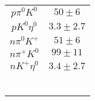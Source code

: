 \begin{table}[h]
{\begin{tabular}{|c|c|}
			$ p \pi^{0} K^{0} $ & $    50 \pm     6 $ \\
		$ p K^{0} \eta^{0} $ & $     3.3 \pm     2.7 $ \\
		$n \pi^{0} K^{+} $ & $    51 \pm     6 $ \\
		$ n \pi^{+} K^{0} $ & $    99 \pm    11 $ \\
		$n K^{+} \eta^{0} $ & $     3.4 \pm     2.7 $ \\
		&   \\
		&   \\
		&   \\
		&   \\
		&   \\	
		&   \\														
		\hline
	\end{tabular}
}
\end{table}

